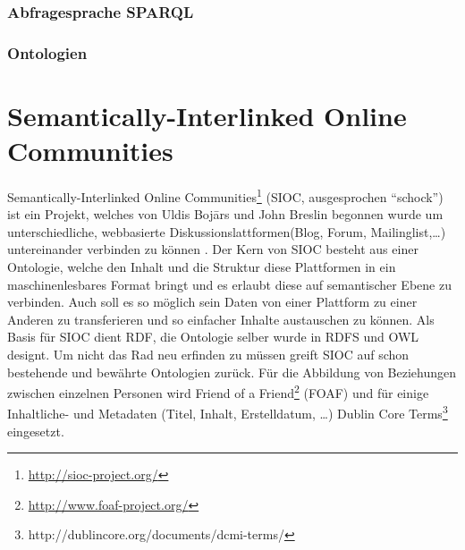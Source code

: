 
\subsubsection{Abfragesprache SPARQL} %
\label{ssub:abfragesprache_sparql}


\subsubsection{Ontologien} %
\label{ssub:ontologien}



\section{Semantically-Interlinked Online Communities} %
\label{sec:verw_arbeiten_sioc}

Semantically-Interlinked Online Communities\footnote{\url{http://sioc-project.org/}} (SIOC, ausgesprochen \enquote{schock}) ist ein Projekt, welches von Uldis Boj\=ars und John Breslin begonnen wurde um unterschiedliche, webbasierte Diskussionslattformen(Blog, Forum, Mailinglist,\dots) untereinander verbinden zu können \cite{Breslin2005}. Der Kern von SIOC besteht aus einer Ontologie, welche den Inhalt und die Struktur diese Plattformen in ein maschinenlesbares Format bringt und es erlaubt diese auf semantischer Ebene zu verbinden. Auch soll es so möglich sein Daten von einer Plattform zu einer Anderen zu transferieren und so einfacher Inhalte austauschen zu können. Als Basis für SIOC dient RDF, die Ontologie selber wurde in RDFS und OWL designt. Um nicht das Rad neu erfinden zu müssen greift SIOC auf schon bestehende und bewährte Ontologien zurück. Für die Abbildung von Beziehungen zwischen einzelnen Personen wird Friend of a Friend\footnote{\url{http://www.foaf-project.org/}} (FOAF) und für einige Inhaltliche- und Metadaten (Titel, Inhalt, Erstelldatum, \dots) Dublin Core Terms\footnote{http://dublincore.org/documents/dcmi-terms/} eingesetzt.

